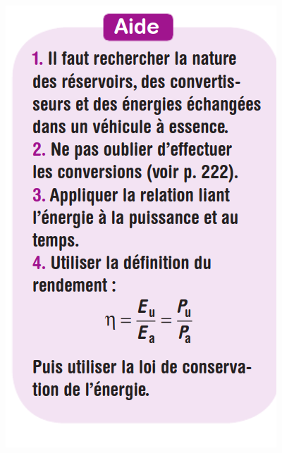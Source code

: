 \documentclass[10pt]{article}
\begin{document}
{\begin{minipage}[c]{0.45\textwidth}
		\includegraphics[scale=0.29]{voiture/aide.png}
	\end{minipage}
}
\vspace{-32pt}
\end{document}
